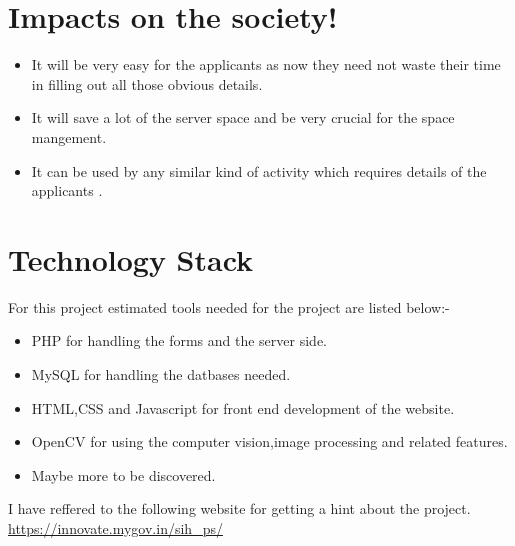 \documentclass[journal]{IEEEtran}
\begin{document}
\section{Impacts on the society!}
\begin{itemize}
\item  It will be very easy for the applicants as now they need not waste their time in filling out all those obvious details.
\item It will save a lot of the server space and be very crucial for the space mangement.
\item It can be used by any similar kind of activity which requires details of the applicants .  
\end{itemize}

\section{Technology Stack}
For this project estimated tools needed for the project are listed below:-
\begin{itemize}
\item PHP for handling the forms and the server side.
\item MySQL for handling the datbases needed.
\item HTML,CSS and Javascript for front end development of the website.
\item OpenCV for using the computer vision,image processing and related features.
\item Maybe more to be discovered. 
\end{itemize}

\begin{thebibliography}{9}
I have reffered to the following website for getting a hint about the project.\\
\url{https://innovate.mygov.in/sih_ps/}
\end{thebibliography}
 
\end{document}
